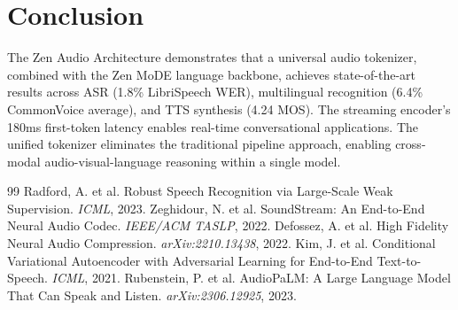 \documentclass[11pt,a4paper]{article}
\begin{document}
\section{Conclusion}

The Zen Audio Architecture demonstrates that a universal audio tokenizer, combined with the Zen MoDE language backbone, achieves state-of-the-art results across ASR (1.8\% LibriSpeech WER), multilingual recognition (6.4\% CommonVoice average), and TTS synthesis (4.24 MOS). The streaming encoder's 180ms first-token latency enables real-time conversational applications. The unified tokenizer eliminates the traditional pipeline approach, enabling cross-modal audio-visual-language reasoning within a single model.

\begin{thebibliography}{99}
 Radford, A. et al. Robust Speech Recognition via Large-Scale Weak Supervision. \textit{ICML}, 2023.
 Zeghidour, N. et al. SoundStream: An End-to-End Neural Audio Codec. \textit{IEEE/ACM TASLP}, 2022.
 Defossez, A. et al. High Fidelity Neural Audio Compression. \textit{arXiv:2210.13438}, 2022.
 Kim, J. et al. Conditional Variational Autoencoder with Adversarial Learning for End-to-End Text-to-Speech. \textit{ICML}, 2021.
 Rubenstein, P. et al. AudioPaLM: A Large Language Model That Can Speak and Listen. \textit{arXiv:2306.12925}, 2023.
\end{thebibliography}
\end{document}
